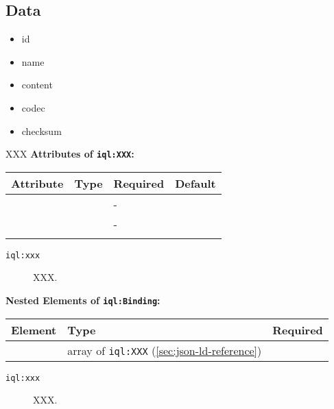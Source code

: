 \documentclass[11pt]{article}
\newcommand{\iqlns}{iql:}
\newcommand{\iqlType}[1]{\texttt{\iqlns#1}}
\newcommand{\attributes}[1]{\noindent\textbf{Attributes of \iqlType{#1}:}\newline\medskip}
\newcommand{\elements}[1]{\noindent\textbf{Nested Elements of \iqlType{#1}:}\newline\medskip}
\newcommand{\desc}[1]{\noindent#1\newline\medskip}
\begin{document}
\subsection{Data}
\label{sec:json-ld-data}
\begin{itemize}
\item id
\item name
\item content
\item codec
\item checksum
\end{itemize}
\desc{XXX}
\attributes{XXX}
\begin{tabular}{|p{}|p{}|p{}|p{}|}
	\hline
	\textbf{Attribute} & \textbf{Type} & \textbf{Required} & \textbf{Default} \\ 
	\hline
	\hline
	&  & - &  \\ 
	\hline 
	&  & - &  \\ 
	\hline 
	&  &  & \\ 
	\hline 
\end{tabular}
\begin{description}
	\item[\iqlType{xxx}] XXX.
\end{description}
\elements{Binding}
\begin{tabular}{|p{}|p{}|p{}|}
	\hline
	\textbf{Element} & \textbf{Type} & \textbf{Required} \\ 
	\hline
	\hline 
	& array of \iqlType{XXX} (\ref{sec:json-ld-reference}) &  \\ 
	\hline 
\end{tabular}
\begin{description}
	\item[\iqlType{xxx}] XXX.
\end{description}

\end{document}
